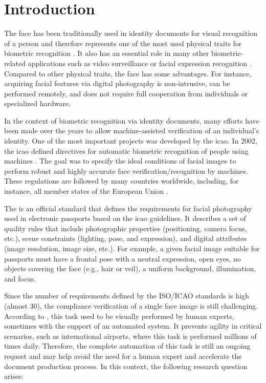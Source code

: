 \section{Introduction} \label{sec:introduction}
 
The face has been traditionally used in identity documents for visual recognition of a person and therefore represents one of the most used physical traits for biometric recognition \citep{ferrara2012face}. It also has an essential role in many other biometric-related applications such as video surveillance \citep{de2015partially} or facial expression recognition \citep{anil2016literature}. Compared to other physical traits, the face has some advantages. For instance, acquiring facial features via digital photography is non-intrusive, can be performed remotely, and does not require full cooperation from individuals or specialized hardware.
 
In the context of biometric recognition via identity documents, many efforts have been made over the years to allow machine-assisted verification of an individual's identity. One of the most important projects was developed by the \acf{icao}. In 2002, the \acs{icao} defined directives for automatic biometric recognition of people using machines \citep{icao2003report}. The goal was to specify the ideal conditions of facial images to perform robust and highly accurate face verification/recognition by machines. These regulations are followed by many countries worldwide, including, for instance, all member states of the European Union \citep{ebinger2008international}.
 
The \icao \citep{iso-iec} is an official standard that defines the requirements for facial photography used in electronic passports based on the \acs{icao} guidelines. It describes a set of quality rules that include photographic properties (positioning, camera focus, etc.), scene constraints (lighting, pose, and expression), and digital attributes (image resolution, image size, etc.). For example, a given facial image suitable for passports must have a frontal pose with a neutral expression, open eyes, no objects covering the face (e.g., hair or veil), a uniform background, illumination, and focus.
 
Since the number of requirements defined by the ISO/ICAO standards is high (almost 30), the compliance verification of a single face image is still challenging. According to \cite{ferrara2012multi}, this task used to be visually performed by human experts, sometimes with the support of an automated system. It prevents agility in critical scenarios, such as international airports, where this task is performed millions of times daily. Therefore, the complete automation of this task is still an ongoing request and may help avoid the need for a human expert and accelerate the document production process. In this context, the following research question arises: 

